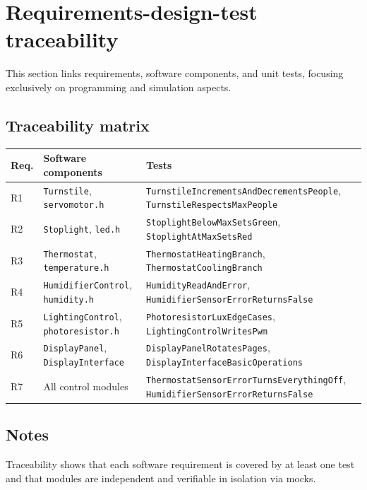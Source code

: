 \chapter{Requirements-design-test traceability}

This section links requirements, software components, and unit tests, focusing exclusively on programming and simulation aspects.

\section{Traceability matrix}
\begingroup
\sloppy
{}
\scriptsize
\setlength{\tabcolsep}{2pt}
\renewcommand{\arraystretch}{1.05}
\begin{tabularx}{\textwidth}{@{}>{\raggedright\arraybackslash}p{1.0cm}>{\raggedright\arraybackslash}X>{\raggedright\arraybackslash}X@{}}
\toprule
Req. & Software components & Tests \\
\midrule
R1 & \texttt{Turnstile}, \texttt{servomotor.h} & \texttt{TurnstileIncrementsAndDecrementsPeople}, \texttt{TurnstileRespectsMaxPeople} \\
R2 & \texttt{Stoplight}, \texttt{led.h} & \texttt{StoplightBelowMaxSetsGreen}, \texttt{StoplightAtMaxSetsRed} \\
R3 & \texttt{Thermostat}, \texttt{temperature.h} & \texttt{ThermostatHeatingBranch}, \texttt{ThermostatCoolingBranch} \\
R4 & \texttt{HumidifierControl}, \texttt{humidity.h} & \texttt{HumidityReadAndError}, \texttt{HumidifierSensorErrorReturnsFalse} \\
R5 & \texttt{LightingControl}, \texttt{photoresistor.h} & \texttt{PhotoresistorLuxEdgeCases}, \texttt{LightingControlWritesPwm} \\
R6 & \texttt{DisplayPanel}, \texttt{DisplayInterface} & \texttt{DisplayPanelRotatesPages}, \texttt{DisplayInterfaceBasicOperations} \\
R7 & All control modules & \texttt{ThermostatSensorErrorTurnsEverythingOff}, \texttt{HumidifierSensorErrorReturnsFalse} \\
\bottomrule
\end{tabularx}
\renewcommand{\arraystretch}{1.0}
\setlength{\tabcolsep}{6pt}
\normalsize
\endgroup

\section{Notes}
Traceability shows that each software requirement is covered by at least one test and that modules are independent and verifiable in isolation via mocks.
